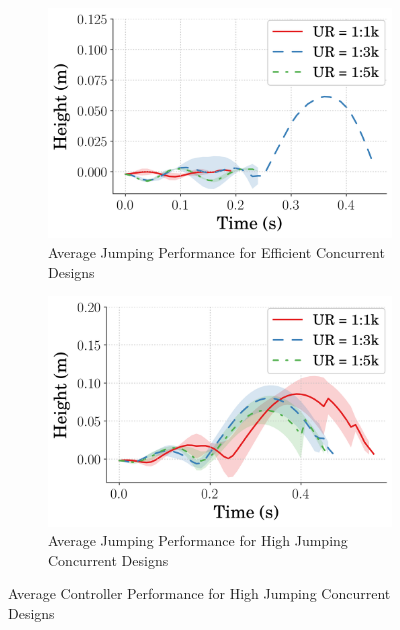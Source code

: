 %  
\begin{figure}[tb!]
  \centering
  \begin{subfigure}{.49\textwidth}
    \centering
    \includegraphics[width=\textwidth]{figures/Ch5/comp_update_rate/avg_eff_RodPos_.png}  
    \caption{Average Jumping Performance for Efficient Concurrent Designs}
    \label{fig:comp_ur_rodpos_eff}
  \end{subfigure}
  \hfill
  \begin{subfigure}{.49\textwidth}
    \centering
    \includegraphics[width=\textwidth]{figures/Ch5/comp_update_rate/avg_hei_RodPos_.png}  
    \caption{Average Jumping Performance for High Jumping Concurrent Designs}
    \label{fig:comp_ur_rodpos_hei}
  \end{subfigure}
   \caption{Average Controller Performance for High Jumping Concurrent Designs}
   \label{fig:comp_ur_rodpos}
\end{figure}
% 

